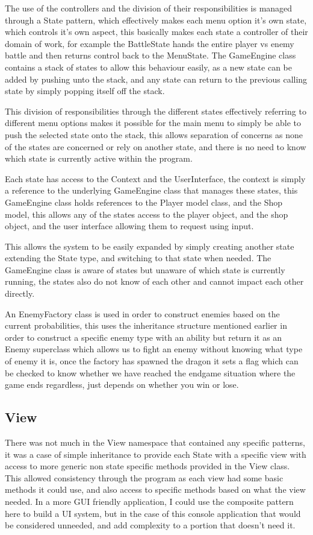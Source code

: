 \documentclass[12pt,titlepage]{article}
\begin{document}
The use of the controllers and the division of their responsibilities is managed through a State pattern, which effectively makes each menu option it's own state, which controls it's own aspect, this basically makes each state a controller of their domain of work, for example the BattleState hands the entire player vs enemy battle and then returns control back to the MenuState. The GameEngine class contains a stack of states to allow this behaviour easily, as a new state can be added by pushing unto the stack, and any state can return to the previous calling state by simply popping itself off the stack.

This division of responsibilities through the different states effectively referring to different menu options makes it possible for the main menu to simply be able to push the selected state onto the stack, this allows separation of concerns as none of the states are concerned or rely on another state, and there is no need to know which state is currently active within the program.

Each state has access to the Context and the UserInterface, the context is simply a reference to the underlying GameEngine class that manages these states, this GameEngine class holds references to the Player model class, and the Shop model, this allows any of the states access to the player object, and the shop object, and the user interface allowing them to request using input.

This allows the system to be easily expanded by simply creating another state extending the State type, and switching to that state when needed. The GameEngine class is aware of states but unaware of which state is currently running, the states also do not know of each other and cannot impact each other directly.

An EnemyFactory class is used in order to construct enemies based on the current probabilities, this uses the inheritance structure mentioned earlier in order to construct a specific enemy type with an ability but return it as an Enemy superclass which allows us to fight an enemy without knowing what type of enemy it is, once the factory has spawned the dragon it sets a flag which can be checked to know whether we have reached the endgame situation where the game ends regardless, just depends on whether you win or lose.

\newpage
\subsection{View}
There was not much in the View namespace that contained any specific patterns, it was a case of simple inheritance to provide each State with a specific view with access to more generic non state specific methods provided in the View class. This allowed consistency through the program as each view had some basic methods it could use, and also access to specific methods based on what the view needed. In a more GUI friendly application, I could use the composite pattern here to build a UI system, but in the case of this console application that would be considered unneeded, and add complexity to a portion that doesn't need it.
\end{document}
